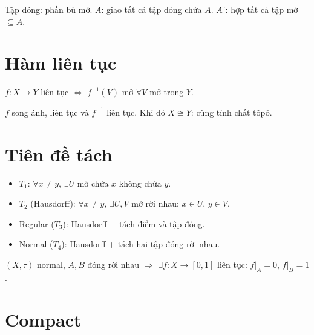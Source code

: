 \documentclass[12pt,a4paper]{article}
\begin{document}
\begin{dinhnghia}[title={Lân cận, đóng, bao đóng, nội}]
  Tập đóng: phần bù mở. $\overline{A}$: giao tất cả tập đóng chứa $A$. $A^\circ$: hợp tất cả tập mở $\subseteq A$.
\end{dinhnghia}

\section{Hàm liên tục}

\begin{dinhnghia}[title={Liên tục (tôpô)}]
  $f: X \to Y$ liên tục $\Leftrightarrow$ $f^{-1}(V)$ mở $\forall V$ mở trong $Y$.
\end{dinhnghia}

\begin{dinhnghia}[title={Phép đồng phôi (Homeomorphism)}]
  $f$ song ánh, liên tục và $f^{-1}$ liên tục. Khi đó $X \cong Y$: cùng tính chất tôpô.
\end{dinhnghia}

\section{Tiên đề tách}

\begin{dinhnghia}[title={Các tiên đề}]
  \begin{itemize}
    \item $T_1$: $\forall x \ne y$, $\exists U$ mở chứa $x$ không chứa $y$.
    \item $T_2$ (Hausdorff): $\forall x \ne y$, $\exists U, V$ mở rời nhau: $x \in U$, $y \in V$.
    \item Regular ($T_3$): Hausdorff + tách điểm và tập đóng.
    \item Normal ($T_4$): Hausdorff + tách hai tập đóng rời nhau.
  \end{itemize}
\end{dinhnghia}

\begin{dinhly}[title={Urysohn}]
  $(X, \tau)$ normal, $A, B$ đóng rời nhau $\Rightarrow$ $\exists f: X \to [0, 1]$ liên tục: $f|_A = 0$, $f|_B = 1$.
\end{dinhly}

\section{Compact}
\end{document}
